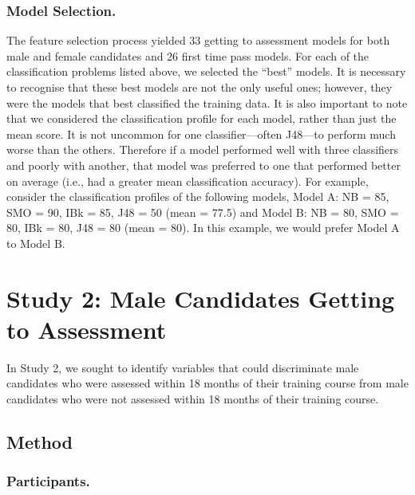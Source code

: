 \documentclass[
  12pt,
  a4paper,
]{book}
\begin{document}
\hypertarget{model-selection.}{%
\subsubsection{Model Selection.}\label{model-selection.}}

The feature selection process yielded 33 getting to assessment models for both male and female candidates and 26 first time pass models. For each of the classification problems listed above, we selected the ``best'' models. It is necessary to recognise that these best models are not the only useful ones; however, they were the models that best classified the training data. It is also important to note that we considered the classification profile for each model, rather than just the mean score. It is not uncommon for one classifier---often J48---to perform much worse than the others. Therefore if a model performed well with three classifiers and poorly with another, that model was preferred to one that performed better on average (i.e., had a greater mean classification accuracy). For example, consider the classification profiles of the following models, Model A: NB = 85, SMO = 90, IBk = 85, J48 = 50 (mean = 77.5) and Model B: NB = 80, SMO = 80, IBk = 80, J48 = 80 (mean = 80). In this example, we would prefer Model A to Model B.

\hypertarget{male-gta}{%
\section{Study 2: Male Candidates Getting to Assessment}\label{male-gta}}

In Study 2, we sought to identify variables that could discriminate male candidates who were assessed within 18 months of their training course from male candidates who were not assessed within 18 months of their training course.

\hypertarget{male-gta-method}{%
\subsection{Method}\label{male-gta-method}}

\hypertarget{male-gta-participants}{%
\subsubsection{Participants.}\label{male-gta-participants}}
\end{document}
